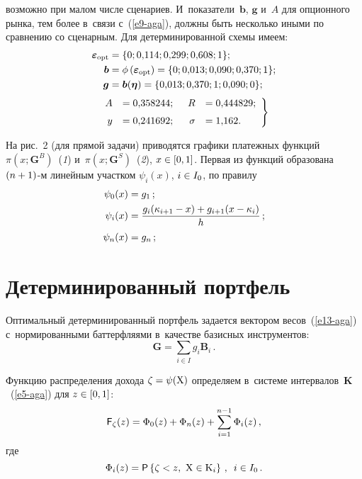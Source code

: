 \begin{multicols}{2}
\vspace*{9pt}

\addtocounter{figure}{1}

\noindent
 возможно при 
малом числе сценариев. И~показатели~$\boldsymbol{b}$, $\boldsymbol{g}$ 
и~$A$ для опционного рынка, тем более в~связи с~(\ref{e9-aga}), должны быть 
несколько иными по сравнению со сценарным. Для детерминированной 
схемы имеем: 
  \begin{align}
  {\boldsymbol{\varepsilon}}_{\mathrm{opt}}& = \{0; 0{,}114; 0{,}299; 0{,}608; 1 \}; \notag\\
 {\boldsymbol{b}} & = \phi\left({\boldsymbol{\varepsilon}}_{\mathrm{opt}}\right) = \{0; 0{,}013; 
0{,}090; 0{,}370; 1\}; \notag\\
  {\boldsymbol{g}} & = \boldsymbol{b}(\boldsymbol{\eta}) = \{ 0{,}013; 0{,}370; 1; 
0{,}090; 0 \};\label{e13-aga}
\end{align}
\begin{equation}
\left.
\begin{array}{rlrl}
  A &= 0{,}358244;&\enskip R &= 0{,}444829;\\[6pt]
  y &= 0{,}241692;&\enskip  \sigma &= 1{,}162.
  \end{array}
  \right\}
    \label{e14-aga}
  \end{equation}
  
  На рис.~2 (для прямой задачи) приводятся графики платежных функций 
$\pi(x; \boldsymbol{G}^B)$~(\textit{1}) и~$\pi(x; \boldsymbol{G}^S)$~(\textit{2}), 
$x\hm\in [0, 1]$. Первая из функций образована $(n\hm+1)$-м 
линейным участком $\psi_i(x)$, $i\hm\in I_0$, по правилу 
 \begin{align*}
  \psi_0(x)&=g_1\,;\\
  \psi_i(x)&=\displaystyle\frac{\displaystyle g_i(\kappa_{i+1}-x)+g_{i+1}(x-\kappa_i)\mathstrut}{\displaystyle h\mathstrut}\,;\\ 
  \psi_n(x)&=g_n\,;
\end{align*}



  \section{Детерминированный портфель}
  
  Оптимальный детерминированный портфель задается вектором 
весов~(\ref{e13-aga}) с~нормированными баттерфляями в~качестве базисных 
инструментов: 
  $$
  \boldsymbol{G}=\sum\limits_{i\in I} g_i \boldsymbol{B}_i\,.
  $$
  
  Функцию распределения дохода $\zeta\hm= \psi(\mathrm{X})$ определяем 
в~системе интервалов~$\mathbf{K}$~(\ref{e5-aga}) для $z\hm\in [0, 1]$: 
  \begin{equation}
  {\sf F}_\zeta(z)=\Phi_0(z) +\Phi_n(z)+\sum\limits_{i=1}^{n-1}\Phi_i(z)\,,
    \label{e15-aga}
    \end{equation}
    где
$$
  \Phi_i(z)={\sf P}\left\{ \zeta<z,\ \mathrm{X}\in \mathrm{K}_i\right\}\,,\enskip 
i\in I_0\,.
  $$


\end{multicols}
